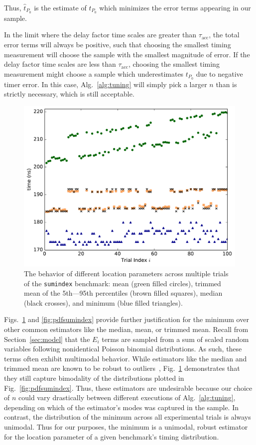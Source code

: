 \documentclass[conference]{IEEEtran}
\begin{document}
Thus, $\hat{t}_{P_0}$ is the estimate of $t_{P_0}$ which minimizes the error terms appearing
in our sample.

In the limit where the delay factor time scales are greater than $\tau_{\textrm{acc}}$, the
total error terms will always be positive, such that choosing the smallest timing
measurement will choose the sample with the smallest magnitude of error. If the delay factor
time scales are less than $\tau_{\textrm{acc}}$, choosing the smallest timing measurement
might choose a sample which underestimates $t_{P_0}$ due to negative timer error. In this
case, Alg.~\ref{alg:tuning} will simply pick a larger $n$ than is strictly necessary, which
is still acceptable.

\begin{figure}
\centering
\includegraphics[width=\columnwidth]{figures/fig3/location_estimators_sumindex}
\caption{The behavior of different location parameters across multiple trials of
the \lstinline|sumindex| benchmark: mean (green filled circles), trimmed mean of
the 5th---95th percentiles (brown filled squares), median (black crosses), and
minimum (blue filled triangles).}
\label{fig:locationmeasures}
\end{figure}

Figs.~\ref{fig:locationmeasures} and \ref{fig:pdfsumindex} provide further
justification for the minimum over other common estimators like the median,
mean, or trimmed mean. Recall from Section~\ref{sec:model} that the $E_i$ terms
are sampled from a sum of scaled random variables following nonidentical
Poisson binomial distributions. As such, these terms often exhibit multimodal
behavior. While estimators like the median and trimmed mean are known to be
robust to outliers~\cite{Maronna2006}, Fig.~\ref{fig:locationmeasures}
demonstrates that they still capture bimodality of the distributions plotted in
Fig.~\ref{fig:pdfsumindex}. Thus, these estimators are undesirable because our
choice of $n$ could vary drastically between different executions of
Alg.~\ref{alg:tuning}, depending on which of the estimator's
modes was captured in the sample.  In contrast, the distribution of
the minimum across all experimental trials is always unimodal. Thus for our
purposes, the minimum is a unimodal, robust estimator for the location
parameter of a given benchmark's timing distribution.
\end{document}
